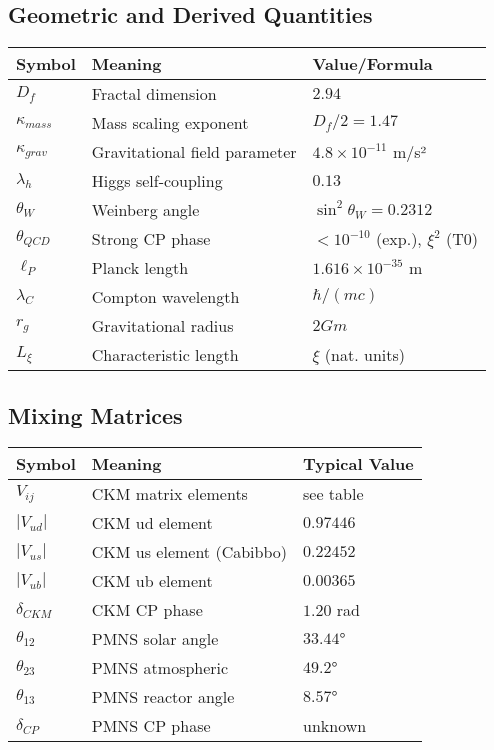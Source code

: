 \documentclass[12pt,a4paper]{article}
\begin{document}
\subsection{Geometric and Derived Quantities}
\begin{longtable}{lll}
	\toprule
	\textbf{Symbol} & \textbf{Meaning} & \textbf{Value/Formula} \\
	\midrule
	$D_f$ & Fractal dimension & $2.94$ \\
	$\kappa_{mass}$ & Mass scaling exponent & $D_f/2 = 1.47$ \\
	$\kappa_{grav}$ & Gravitational field parameter & $4.8 \times 10^{-11}$ m/s² \\
	$\lambda_h$ & Higgs self-coupling & $0.13$ \\
	$\theta_W$ & Weinberg angle & $\sin^2\theta_W = 0.2312$ \\
	$\theta_{QCD}$ & Strong CP phase & $< 10^{-10}$ (exp.), $\xi^2$ (T0) \\
	$\ell_P$ & Planck length & $1.616 \times 10^{-35}$ m \\
	$\lambda_C$ & Compton wavelength & $\hbar/(mc)$ \\
	$r_g$ & Gravitational radius & $2Gm$ \\
	$L_\xi$ & Characteristic length & $\xi$ (nat. units) \\
	\bottomrule
\end{longtable}

\subsection{Mixing Matrices}
\begin{longtable}{lll}
	\toprule
	\textbf{Symbol} & \textbf{Meaning} & \textbf{Typical Value} \\
	\midrule
	$V_{ij}$ & CKM matrix elements & see table \\
	$|V_{ud}|$ & CKM ud element & $0.97446$ \\
	$|V_{us}|$ & CKM us element (Cabibbo) & $0.22452$ \\
	$|V_{ub}|$ & CKM ub element & $0.00365$ \\
	$\delta_{CKM}$ & CKM CP phase & $1.20$ rad \\
	$\theta_{12}$ & PMNS solar angle & $33.44°$ \\
	$\theta_{23}$ & PMNS atmospheric & $49.2°$ \\
	$\theta_{13}$ & PMNS reactor angle & $8.57°$ \\
	$\delta_{CP}$ & PMNS CP phase & unknown \\
	\bottomrule
\end{longtable}
\end{document}

